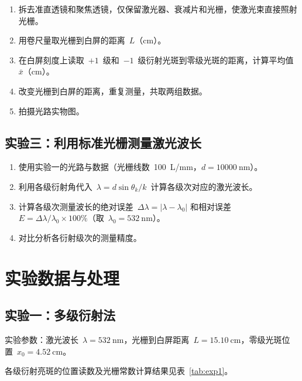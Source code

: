 \documentclass[12pt, a4paper]{article}
\begin{document}
\begin{enumerate}
  \item 拆去准直透镜和聚焦透镜，仅保留激光器、衰减片和光栅，使激光束直接照射光栅。
  \item 用卷尺量取光栅到白屏的距离~$L$（cm）。
  \item 在白屏刻度上读取~$+1$~级和~$-1$~级衍射光斑到零级光斑的距离，计算平均值~$\bar{x}$（cm）。
  \item 改变光栅到白屏的距离，重复测量，共取两组数据。
  \item 拍摄光路实物图。
\end{enumerate}

\subsection{实验三：利用标准光栅测量激光波长}

\begin{enumerate}
  \item 使用实验一的光路与数据（光栅线数~100~L/mm，$d = 10000~\text{nm}$）。
  \item 利用各级衍射角代入~$\lambda = d\sin\theta_k / k$~计算各级次对应的激光波长。
  \item 计算各级次测量波长的绝对误差~$\Delta\lambda = |\lambda - \lambda_0|$ 和相对误差~$E = \Delta\lambda/\lambda_0 \times 100\%$（取~$\lambda_0 = 532~\text{nm}$）。
  \item 对比分析各衍射级次的测量精度。
\end{enumerate}


\section{实验数据与处理}

\subsection{实验一：多级衍射法}

实验参数：激光波长~$\lambda = 532~\text{nm}$，光栅到白屏距离~$L = 15.10~\text{cm}$，零级光斑位置~$x_0 = 4.52~\text{cm}$。

各级衍射亮斑的位置读数及光栅常数计算结果见表~\ref{tab:exp1}。
\end{document}
